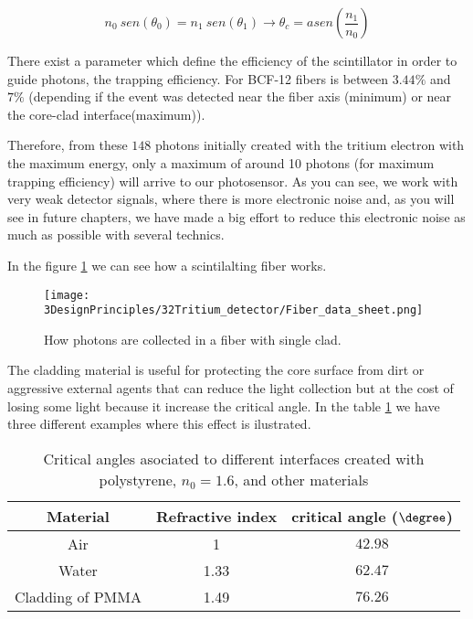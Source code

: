 \begin{equation}
n_0~sen(\theta_0) = n_1~sen(\theta_1) \longrightarrow \theta_c = asen\left(\frac{n_1}{n_0} \right)
\label{eq:Snell}
\end{equation}

There exist a parameter which define the efficiency of the scintillator in order to guide photons, the trapping efficiency. For BCF-12 fibers is between $3.44\%$ and $7\%$ (depending if the event was detected near the fiber axis (minimum) or near the core-clad interface(maximum)).

Therefore, from these $148$ photons initially created with the tritium electron with the maximum energy, only a maximum of around 10 photons (for maximum trapping efficiency) will arrive to our photosensor. As you can see, we work with very weak detector signals, where there is more electronic noise and, as you will see in future chapters, we have made a big effort to reduce this electronic noise as much as possible with several technics.

In the figure \ref{fig:Fiber_physic} we can see how a scintilalting fiber works.

\begin{figure}[htbp]
\centering
\texttt{[image: 3DesignPrinciples/32Tritium\_detector/Fiber\_data\_sheet.png]}
\caption{How photons are collected in a fiber with single clad.\label{fig:Fiber_physic}~\cite{DataSheetBCF12Fiber}}
\end{figure}

The cladding material is useful for protecting the core surface from dirt or aggressive external agents that can reduce the light collection but at the cost of losing some light because it increase the critical angle. In the table \ref{tab:CriticalAngles} we have three different examples where this effect is ilustrated.

\begin{table}[htbp]
\begin{center}
\begin{tabular}{|c|c|c|}
\hline
Material & Refractive index & critical angle ($\degree$) \\
\hline \hline \hline
Air & 1 & $42.98$ \\ \hline
Water & 1.33 & $62.47$ \\ \hline
Cladding of PMMA & 1.49 & $76.26$ \\ \hline
\end{tabular}
\caption{Critical angles asociated to different interfaces created with polystyrene, $n_0=1.6$, and other materials}
\label{tab:CriticalAngles}
\end{center}
\end{table}

